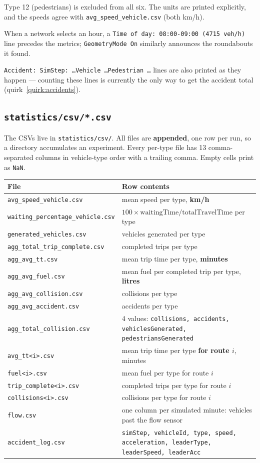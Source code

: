 \documentclass[11pt, a4paper]{article}
\newcommand{\code}[1]{\texttt{#1}}
\begin{document}
\medskip
Type 12 (pedestrians) is excluded from all six. The units are printed explicitly,
and the speeds agree with \code{avg\_speed\_vehicle.csv} (both km/h).

When a network selects an hour, a \code{Time of day: 08:00-09:00 (4715 veh/h)}
line precedes the metrics; \code{GeometryMode On} similarly announces the
roundabouts it found.

\code{Accident: SimStep: \dots Vehicle \dots Pedestrian \dots} lines are also
printed as they happen --- counting these lines is currently the only way to get
the accident total (quirk~\ref{quirk:accidents}).

\subsection{\code{statistics/csv/*.csv}}

The CSVs live in \code{statistics/csv/}. All files are \textbf{appended}, one row
per run, so a directory accumulates an experiment. Every per-type file has 13 comma-separated columns in vehicle-type
order with a trailing comma. Empty cells print as \code{NaN}.

\begin{tabularx}{\textwidth}{l X}
\toprule
\textbf{File} & \textbf{Row contents} \\
\midrule
\code{avg\_speed\_vehicle.csv} & mean speed per type, \textbf{km/h} \\
\code{waiting\_percentage\_vehicle.csv} & $100 \times \text{waitingTime}/\text{totalTravelTime}$ per type \\
\code{generated\_vehicles.csv} & vehicles generated per type \\
\code{agg\_total\_trip\_complete.csv} & completed trips per type \\
\code{agg\_avg\_tt.csv} & mean trip time per type, \textbf{minutes} \\
\code{agg\_avg\_fuel.csv} & mean fuel per completed trip per type, \textbf{litres} \\
\code{agg\_avg\_collision.csv} & collisions per type \\
\code{agg\_avg\_accident.csv} & accidents per type \\
\code{agg\_total\_collision.csv} & 4 values: \code{collisions, accidents, vehiclesGenerated, pedestriansGenerated} \\
\code{avg\_tt<i>.csv} & mean trip time per type \textbf{for route $i$}, minutes \\
\code{fuel<i>.csv} & mean fuel per type for route $i$ \\
\code{trip\_complete<i>.csv} & completed trips per type for route $i$ \\
\code{collisions<i>.csv} & collisions per type for route $i$ \\
\code{flow.csv} & one column per simulated minute: vehicles past the flow sensor \\
\code{accident\_log.csv} & \code{simStep, vehicleId, type, speed, acceleration, leaderType, leaderSpeed, leaderAcc} \\
\bottomrule
\end{tabularx}
\end{document}
